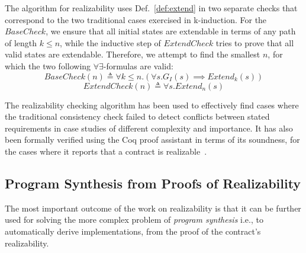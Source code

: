 The algorithm for realizability uses Def.~\ref{def:extend} in two
separate checks that correspond to the two traditional cases exercised in
k-induction. For the $\mathit{BaseCheck}$, we ensure that all initial states are
extendable in terms of any path of length $k\le n$, while the inductive step of
$\mathit{ExtendCheck}$ tries to prove that all valid states are extendable.
Therefore, we attempt to find the smallest $n$, for which the two following 
$\forall\exists$-formulas are valid:%
%
\begin{equation}
\label{eq:sbcheck}
\mathit{BaseCheck}(n) \triangleq \forall k \leq n. (\forall s. G_I(s)
	  	\implies \mathit{Extend}_k(s))
\end{equation}%
%
\begin{equation}
\label{eq:echeck}
\mathit{ExtendCheck}(n) \triangleq \forall s. \mathit{Extend}_n(s)
\end{equation}

The realizability checking algorithm has been used to effectively find cases
where the traditional consistency check 
failed to detect conflicts between
stated requirements in case studies of different complexity and importance. It
has also been formally verified using the Coq proof assistant in terms of its
soundness, for the cases where it reports that a contract is
realizable~\cite{katis2015machine}.

\subsection{Program Synthesis from Proofs of Realizability}

The most important outcome of the work on realizability is that it 
 can be further used for solving the more complex problem of
\emph{program synthesis} i.e., to automatically
derive implementations, from the proof of the contract's
realizability.

